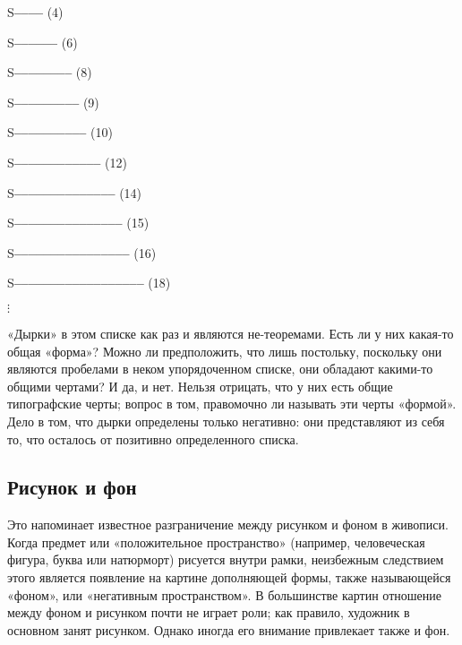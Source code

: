 \documentclass[../main.tex]{subfiles}
\begin{document}
\begin{center}
\begin{minipage}{0.4\textwidth}
    S\textbf{--{}--{}--{}--} (4)

    S\textbf{--{}--{}--{}--{}--{}--} (6)

    S\textbf{--{}--{}--{}--{}--{}--{}--{}--} (8)

    S\textbf{--{}--{}--{}--{}--{}--{}--{}--{}--} (9)

    S\textbf{--{}--{}--{}--{}--{}--{}--{}--{}--{}--} (10)

    S\textbf{--{}--{}--{}--{}--{}--{}--{}--{}--{}--{}--{}--} (12)

    S\textbf{--{}--{}--{}--{}--{}--{}--{}--{}--{}--{}--{}--{}--{}--} (14)

    S\textbf{--{}--{}--{}--{}--{}--{}--{}--{}--{}--{}--{}--{}--{}--{}--} (15)

    S\textbf{--{}--{}--{}--{}--{}--{}--{}--{}--{}--{}--{}--{}--{}--{}--{}--} (16)

    S\textbf{--{}--{}--{}--{}--{}--{}--{}--{}--{}--{}--{}--{}--{}--{}--{}--{}--{}--} (18)
\end{minipage}

$\vdots$
\end{center}

«Дырки» в этом списке как раз и являются не-теоремами. Есть ли у них какая-то общая «форма»? Можно ли предположить, что лишь постольку, поскольку они являются пробелами в неком упорядоченном списке, они обладают какими-то общими чертами? И да, и нет. Нельзя отрицать, что у них есть общие типографские черты; вопрос в том, правомочно ли называть эти черты «формой». Дело в том, что дырки определены только негативно: они представляют из себя то, что осталось от позитивно определенного списка.


\subsection{Рисунок и фон}

Это напоминает известное разграничение между рисунком и фоном в живописи. Когда предмет или «положительное пространство» (например, человеческая фигура, буква или натюрморт) рисуется внутри рамки, неизбежным следствием этого является появление на картине дополняющей формы, также называющейся «фоном», или «негативным пространством». В большинстве картин отношение между фоном и рисунком почти не играет роли; как правило, художник в основном занят рисунком. Однако иногда его внимание привлекает также и фон.
\end{document}
